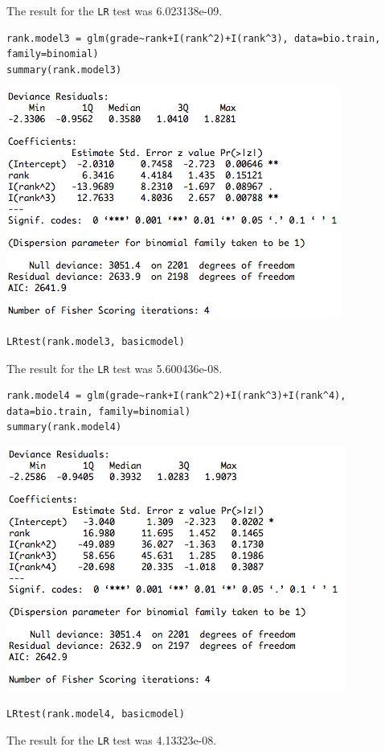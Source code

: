 \documentclass[11pt]{article}
\begin{document}
\begin{enumerate}
\begin{enumerate}
\begin{itemize}
	The result for the \verb|LR| test was 6.023138e-09.

\begin{Verbatim}
rank.model3 = glm(grade~rank+I(rank^2)+I(rank^3), data=bio.train, family=binomial)
summary(rank.model3)
\end{Verbatim}
		\begin{center}
			\includegraphics[scale=0.7]{rank_model3}
		\end{center}
\begin{Verbatim}
LRtest(rank.model3, basicmodel)
\end{Verbatim}
	The result for the \verb|LR| test was 5.600436e-08.

\begin{Verbatim}
rank.model4 = glm(grade~rank+I(rank^2)+I(rank^3)+I(rank^4), data=bio.train, family=binomial)
summary(rank.model4)
\end{Verbatim}
		\begin{center}
			\includegraphics[scale=0.7]{rank_model4}
		\end{center}
\begin{Verbatim}
LRtest(rank.model4, basicmodel)
\end{Verbatim}
	The result for the \verb|LR| test was 4.13323e-08.


\end{itemize}
\end{enumerate}
\end{enumerate}
\end{document}
